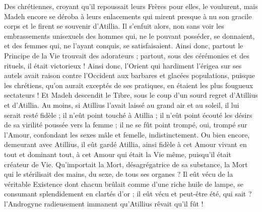 \documentclass[a4paper, 11pt, oneside, polutonikogreek, french]{article}
\begin{document}
Des chrétiennes, croyant qu'il repoussait leurs Frères pour elles, le voulurent, mais Madeh encore se déroba à leurs enlacements qui mirent presque à nu son gracile corps et le firent se souvenir d'Atillia. Il s'enfuit alors, non sans voir les embrassements unisexuels des hommes qui, ne le pouvant posséder, se donnaient, et des femmes qui, ne l'ayant conquis, se satisfaisaient. Ainsi donc, partout le Principe de la Vie trouvait des adorateurs ; partout, sous des cérémonies et des rituels, il était victorieux ! Ainsi donc, l'Orient qui hardiment l'érigea sur ses autels avait raison contre l'Occident aux barbares et glacées populations, puisque les chrétiens, qu'on aurait exceptés de ses pratiques, en étaient les plus fougueux sectateurs ! Et Madeh descendit le Tibre, sous le coup d'un sourd regret d'Atillius et d'Atillia. Au moins, si Atillius l'avait laissé au grand air et au soleil, il lui serait resté fidèle ; il n'eût point touché à Atillia ; il n'eût point écouté les désirs de sa virilité poussée vers la femme ; il ne se fût point trompé, oui, trompé sur l'Amour, confondant les sexes mâle et femelle, indistinctement. Ou bien encore, demeurant avec Atillius, il eût gardé Atillia, ainsi fidèle à cet Amour vivant en tout et dominant tout, à cet Amour qui était la Vie même, puisqu'il était créateur de Vie. Qu'importait la Mort, désagrégatrice de sa substance, la Mort qui le stérilisait des mains, du sexe, de tous ses organes ? Il eût vécu de la véritable Existence dont chacun brûlait comme d'une riche huile de lampe, se consumant splendidement en clartés d'or ; il eût vécu et peut-être été, qui sait ? l'Androgyne radieusement immanent qu'Atillius rêvait qu'il fût !
\end{document}
